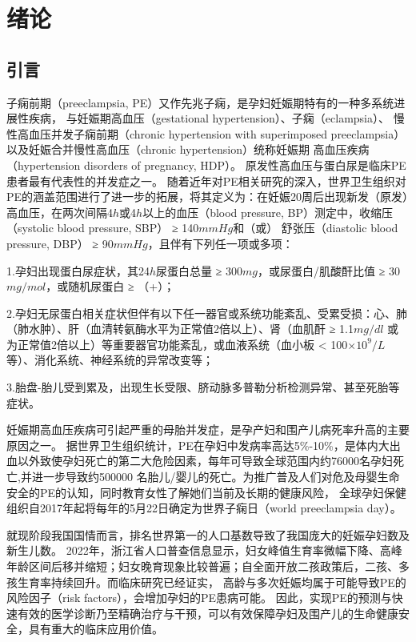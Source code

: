 \chapter{绪论}

\section{引言}
子痫前期（preeclampsia, PE）又作先兆子痫，是孕妇妊娠期特有的一种多系统进展性疾病， 与妊娠期高血压（gestational hypertension）、子痫（eclampsia）、
慢性高血压并发子痫前期（chronic hypertension with superimposed preeclampsia）以及妊娠合并慢性高血压（chronic hypertension）统称妊娠期
高血压疾病（hypertension disorders of pregnancy, HDP）\cite{OAG9,HDASOM,2000s1}。
原发性高血压与蛋白尿是临床PE患者最有代表性的并发症之一。
随着近年对PE相关研究的深入，世界卫生组织对PE的涵盖范围进行了进一步的拓展，将其定义为：在妊娠20周后出现新发（原发）高血压，在两次间隔4$h$或4$h$以上的血压（blood pressure, BP）测定中，收缩压（systolic blood pressure, SBP） ≥ 140$mmHg$和（或）
舒张压（diastolic blood pressure, DBP） ≥ 90$mmHg$，且伴有下列任一项或多项\cite{OAG9,FIGO}：

1.孕妇出现蛋白尿症状，其24$h$尿蛋白总量 ≥ 300$mg$，或尿蛋白/肌酸酐比值 ≥ 30$mg/mol$，或随机尿蛋白 ≥ （+）；

2.孕妇无尿蛋白相关症状但伴有以下任一器官或系统功能紊乱、受累受损：心、肺（肺水肿）、肝（血清转氨酶水平为正常值2倍以上）、肾（血肌酐 ≥ 1.1$mg/dl$
或为正常值2倍以上）等重要器官功能紊乱，或血液系统（血小板 < 100$\times 10^{9}/L$等）、消化系统、神经系统的异常改变等；

3.胎盘-胎儿受到累及，出现生长受限、脐动脉多普勒分析检测异常、甚至死胎等症状。

妊娠期高血压疾病可引起严重的母胎并发症，是孕产妇和围产儿病死率升高的主要原因之一\cite{OAG9}。
据世界卫生组织统计，PE在孕妇中发病率高达5\%-10\%，是体内大出血以外致使孕妇死亡的第二大危险因素，每年可导致全球范围内约76000名孕妇死亡,并进一步导致约500000
名胎儿/婴儿的死亡\cite{DAM2015,LCT2006}。为推广普及人们对危及母婴生命安全的PE的认知，同时教育女性了解她们当前及长期的健康风险，
全球孕妇保健组织自2017年起将每年的5月22日确定为世界子痫日（world preeclampsia day）。

就现阶段我国国情而言，排名世界第一的人口基数导致了我国庞大的妊娠孕妇数及新生儿数\cite{nbs2022}。
2022年，浙江省人口普查信息显示，妇女峰值生育率微幅下降、高峰年龄区间后移并缩短；妇女晚育现象比较普遍；自全面开放二孩政策后，二孩、多孩生育率持续回升\cite{zjtjj2022}。而临床研究已经证实，
高龄与多次妊娠均属于可能导致PE的风险因子（risk factors），会增加孕妇的PE患病可能\cite{Duckitt2005,FIGO,Yogev2010,Poon2010,Lee2000,Coonrod1995,Robillard1993}。
因此，实现PE的预测与快速有效的医学诊断乃至精确治疗与干预，可以有效保障孕妇及围产儿的生命健康安全，具有重大的临床应用价值。
